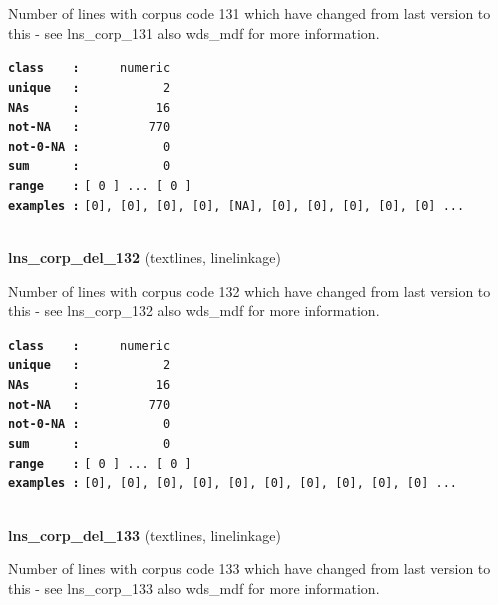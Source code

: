 \documentclass[]{article}
\begin{document}
Number of lines with corpus code 131 which have changed from last
version to this - see lns\_corp\_131 also wds\_mdf for more information.

\textbf{\texttt{class\ \ \ \ :}} \texttt{~~~~~numeric}\\
\textbf{\texttt{unique\ \ \ :}} \texttt{~~~~~~~~~~~2}\\
\textbf{\texttt{NAs\ \ \ \ \ \ :}} \texttt{~~~~~~~~~~16}\\
\textbf{\texttt{not-NA\ \ \ :}} \texttt{~~~~~~~~~770}\\
\textbf{\texttt{not-0-NA\ :}} \texttt{~~~~~~~~~~~0}\\
\textbf{\texttt{sum\ \ \ \ \ \ :}} \texttt{~~~~~~~~~~~0}\\
\textbf{\texttt{range\ \ \ \ :}}
\texttt{{[}\ 0\ {]}\ ...\ {[}\ 0\ {]}}\\
\textbf{\texttt{examples\ :}}
\texttt{{[}0{]},\ {[}0{]},\ {[}0{]},\ {[}0{]},\ {[}NA{]},\ {[}0{]},\ {[}0{]},\ {[}0{]},\ {[}0{]},\ {[}0{]}\ ...}\\

~

\textbf{lns\_corp\_del\_132} (textlines, linelinkage)

Number of lines with corpus code 132 which have changed from last
version to this - see lns\_corp\_132 also wds\_mdf for more information.

\textbf{\texttt{class\ \ \ \ :}} \texttt{~~~~~numeric}\\
\textbf{\texttt{unique\ \ \ :}} \texttt{~~~~~~~~~~~2}\\
\textbf{\texttt{NAs\ \ \ \ \ \ :}} \texttt{~~~~~~~~~~16}\\
\textbf{\texttt{not-NA\ \ \ :}} \texttt{~~~~~~~~~770}\\
\textbf{\texttt{not-0-NA\ :}} \texttt{~~~~~~~~~~~0}\\
\textbf{\texttt{sum\ \ \ \ \ \ :}} \texttt{~~~~~~~~~~~0}\\
\textbf{\texttt{range\ \ \ \ :}}
\texttt{{[}\ 0\ {]}\ ...\ {[}\ 0\ {]}}\\
\textbf{\texttt{examples\ :}}
\texttt{{[}0{]},\ {[}0{]},\ {[}0{]},\ {[}0{]},\ {[}0{]},\ {[}0{]},\ {[}0{]},\ {[}0{]},\ {[}0{]},\ {[}0{]}\ ...}\\

~

\textbf{lns\_corp\_del\_133} (textlines, linelinkage)

Number of lines with corpus code 133 which have changed from last
version to this - see lns\_corp\_133 also wds\_mdf for more information.
\end{document}
